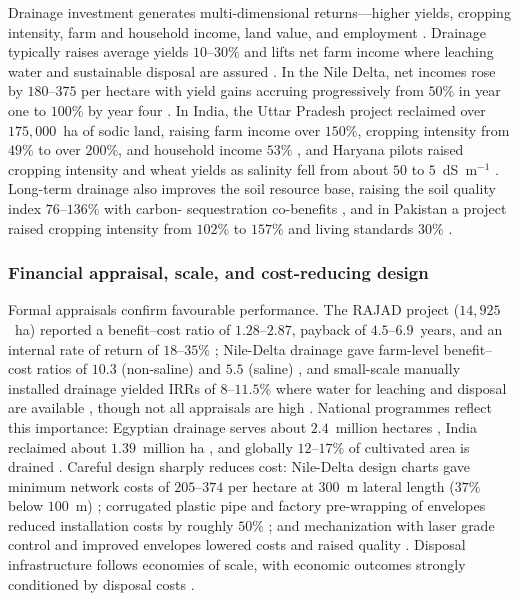 Drainage investment generates multi-dimensional returns---higher yields, cropping
intensity, farm and household income, land value, and employment
\parencite{Gopalakrishnan2007,AbdelDayem2007}. Drainage typically raises average
yields $10$--$30\%$ and lifts net farm income where leaching water and
sustainable disposal are assured \parencite{AbdelDayem2007,Datta2000,Wichelns2002}.
In the Nile Delta, net incomes rose by $180$--$375$ per hectare with yield gains
accruing progressively from $50\%$ in year one to $100\%$ by year four
\parencite{Wichelns2002}. In India, the Uttar Pradesh project reclaimed over
$175{,}000$~ha of sodic land, raising farm income over $150\%$, cropping
intensity from $49\%$ to over $200\%$, and household income $53\%$
\parencite{Gopalakrishnan2007}, and Haryana pilots raised cropping intensity and
wheat yields as salinity fell from about $50$ to $5$~dS~m$^{-1}$
\parencite{Datta2002,Datta2000}. Long-term drainage also improves the soil
resource base, raising the soil quality index $76$--$136\%$ with carbon-
sequestration co-benefits \parencite{Mukhopadhyay2023,Mukhopadhyay2023b}, and in
Pakistan a project raised cropping intensity from $102\%$ to $157\%$ and living
standards $30\%$ \parencite{Ghumman2011}.

\subsubsection{Financial appraisal, scale, and cost-reducing design}

Formal appraisals confirm favourable performance. The RAJAD project
($14{,}925$~ha) reported a benefit--cost ratio of $1.28$--$2.87$, payback of
$4.5$--$6.9$~years, and an internal rate of return of $18$--$35\%$
\parencite{Gopalakrishnan2007}; Nile-Delta drainage gave farm-level benefit--cost
ratios of $10.3$ (non-saline) and $5.5$ (saline) \parencite{Wichelns2002}, and
small-scale manually installed drainage yielded IRRs of $8$--$11.5\%$ where water
for leaching and disposal are available \parencite{Datta2000,Datta2002}, though
not all appraisals are high \parencite{Ghumman2011}.
National programmes reflect this importance: Egyptian drainage serves about
$2.4$~million hectares \parencite{AbdelDayem2007}, India reclaimed about
$1.39$~million ha \parencite{Gopalakrishnan2007}, and globally $12$--$17\%$ of
cultivated area is drained \parencite{Valipour2014}. Careful design
sharply reduces cost: Nile-Delta design charts gave minimum network costs of
$205$--$374$ per hectare at $300$~m lateral length ($37\%$ below $100$~m)
\parencite{Gabr2024}; corrugated plastic pipe and factory pre-wrapping of
envelopes reduced installation costs by roughly $50\%$ \parencite{Yannopoulos2020};
and mechanization with laser grade control and improved envelopes lowered costs
and raised quality \parencite{Ritzema2006,Ritzema2007,TeKrony2004}. Disposal
infrastructure follows economies of scale, with economic outcomes strongly
conditioned by disposal costs \parencite{Singh2001,Bethune2008,HANSON1994,Napierala2024}.

